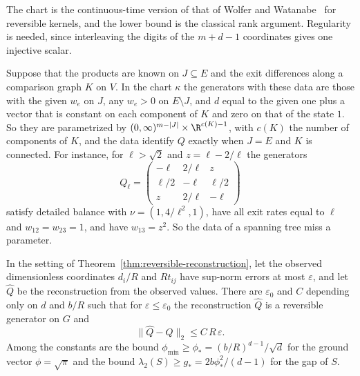 The chart is the continuous-time version of that of Wolfer and
Watanabe~\cite[Theorems~3, 5 and~6]{wolferwatanabe2021} for reversible kernels,
and the lower bound is the classical rank argument. Regularity is needed, since
interleaving the digits of the $m+d-1$ coordinates gives one injective scalar.

\begin{remark}\label{rem:partial-data}
Suppose that the products are known on $J\subseteq E$ and the exit differences
along a comparison graph $K$ on $V$. In the chart $\kappa$ the generators with
these data are those with the given $w_e$ on $J$, any $w_e>0$ on $E\setminus J$,
and $d$ equal to the given one plus a vector that is constant on each component
of $K$ and zero on that of the state $1$. So they are parametrized by
$(0,\infty)^{m-|J|}\times\R^{c(K)-1}$, with $c(K)$ the number of components of
$K$, and the data identify $Q$ exactly when $J=E$ and $K$ is connected. For
instance, for $\ell>\sqrt2$ and $z=\ell-2/\ell$ the generators
\[
 Q_\ell=\begin{pmatrix}-\ell&2/\ell&z\\ \ell/2&-\ell&\ell/2\\ z&2/\ell&-\ell\end{pmatrix}
\]
satisfy detailed balance with $\nu=(1,4/\ell^2,1)$, have all exit rates equal
to $\ell$ and $w_{12}=w_{23}=1$, and have $w_{13}=z^2$. So the data of a spanning
tree miss a parameter.
\end{remark}

\begin{theorem}[stability]\label{thm:stability}
In the setting of Theorem~\ref{thm:reversible-reconstruction}, let the
observed dimensionless coordinates $d_i/R$ and $Rt_{ij}$ have sup-norm errors
at most $\varepsilon$, and let $\widehat Q$ be the reconstruction from the
observed values. There are $\varepsilon_0$ and $C$ depending only on $d$ and
$b/R$ such that for $\varepsilon\le\varepsilon_0$ the reconstruction
$\widehat Q$ is a reversible generator on $G$ and
\[
 \|\widehat Q-Q\|_2\le C\,R\,\varepsilon .
\]
Among the constants are the bound $\phi_{\min}\ge \phi_*=(b/R)^{d-1}/\sqrt d$
for the ground vector $\phi=\sqrt\pi$ and the bound
$\lambda_2(S)\ge g_*=2b\phi_*^2/(d-1)$ for the gap of $S$.
\end{theorem}

